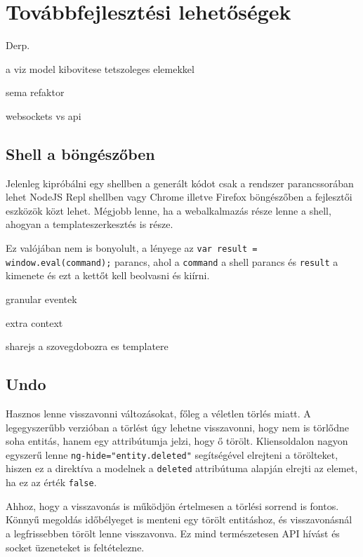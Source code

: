 
\section{Továbbfejlesztési lehetőségek}
Derp.

a viz model kibovitese tetszoleges elemekkel

sema refaktor

websockets vs api

\subsection{Shell a böngészőben}

Jelenleg kipróbálni egy shellben a generált kódot csak a rendszer parancssorában lehet NodeJS Repl shellben vagy Chrome illetve Firefox böngészőben a fejlesztői eszközök közt lehet. Mégjobb lenne, ha a webalkalmazás része lenne a shell, ahogyan a templateszerkesztés is része.

Ez valójában nem is bonyolult, a lényege az \lstinline{var result = window.eval(command);} parancs, ahol a \lstinline{command} a shell parancs és \lstinline{result} a kimenete és ezt a kettőt kell beolvasni és kiírni.

granular eventek

extra context

sharejs a szovegdobozra es templatere

\subsection{Undo}

Hasznos lenne visszavonni változásokat, főleg a véletlen törlés miatt. A legegyszerűbb verzióban a törlést úgy lehetne visszavonni, hogy nem is törlődne soha entitás, hanem egy attribútumja jelzi, hogy ő törölt. Kliensoldalon nagyon egyszerű lenne \lstinline{ng-hide="entity.deleted"} segítségével elrejteni a törölteket, hiszen ez a direktíva a modelnek a \lstinline{deleted} attribútuma alapján elrejti az elemet, ha ez az érték \lstinline{false}. 

Ahhoz, hogy a visszavonás is működjön értelmesen a törlési sorrend is fontos. Könnyű megoldás időbélyeget is menteni egy törölt entitáshoz, és visszavonásnál a legfrissebben törölt lenne visszavonva. Ez mind természetesen API hívást és socket üzeneteket is feltételezne.


